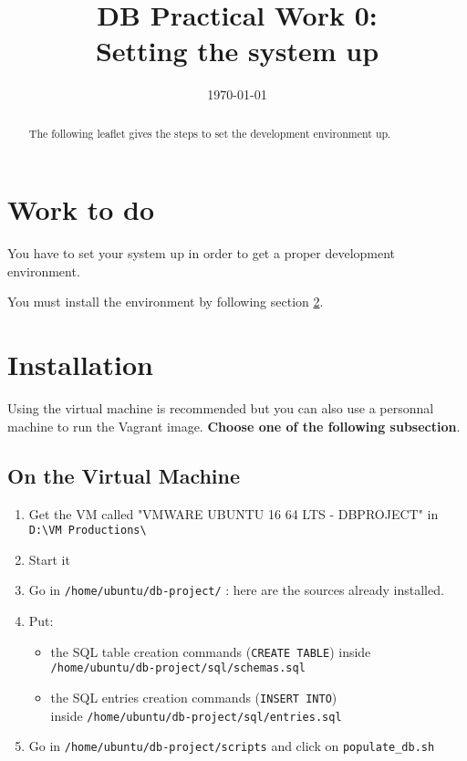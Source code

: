 \documentclass[twoside,a4paper,12pt]{article}
\title{DB Practical Work 0:\\Setting the system up}
\date{\today}
\begin{document}
\maketitle

\begin{abstract}
  The following leaflet gives the steps to set the development environment up.
\end{abstract}

\tableofcontents

\clearpage

\section{Work to do}
You have to set your system up in order to get a proper development environment.

You must install the environment by following section \ref{sec:installation}.

\section{Installation}
\label{sec:installation}

Using the virtual machine is recommended but you can also use a personnal machine to run the Vagrant image. \textbf{Choose one of the following subsection}.

\newpage
\subsection{On the Virtual Machine}
\begin{enumerate}
\item Get the VM called "VMWARE UBUNTU 16 64 LTS - DBPROJECT" in \texttt{D:\textbackslash VM Productions\textbackslash}
\item Start it
\item Go in \texttt{/home/ubuntu/db-project/} : here are the sources already installed.
\item Put:
\begin{itemize}
	\item the SQL table creation commands (\texttt{CREATE TABLE}) inside\\ \texttt{/home/ubuntu/db-project/sql/schemas.sql}
	\item the SQL entries creation commands (\texttt{INSERT INTO})\\ inside \texttt{/home/ubuntu/db-project/sql/entries.sql}
\end{itemize}
\item Go in \texttt{/home/ubuntu/db-project/scripts} and click on \texttt{populate\_db.sh}
\end{enumerate}
\end{document}

